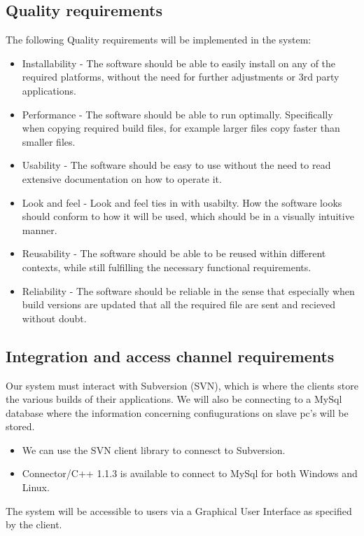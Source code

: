\documentclass[a4paper,12pt,final]{article}
\begin{document}
\subsection{Quality requirements}
The following Quality requirements will be implemented in the system:
\begin{itemize}
\item Installability - The software should be able to easily install on any of the required platforms, without the need for further adjustments or 3rd party applications.
\item Performance - The software should be able to run optimally. Specifically when copying required build files, for example larger files copy faster than smaller files.
\item Usability - The software should be easy to use without the need to read extensive documentation on how to operate it.
\item Look and feel - Look and feel ties in with usabilty.  How the software looks should conform to how it will be used, which should be in a visually intuitive manner.
\item Reusability - The software should be able to be reused within different contexts, while still fulfilling the necessary functional requirements.
\item Reliability - The software should be reliable in the sense that especially when build versions are updated that all the required file are sent and recieved without doubt.
\end{itemize}
\subsection{Integration and access channel requirements}
Our system must interact with Subversion (SVN), which is where the clients store the various builds of their applications. We will also be connecting to a MySql database where the information concerning confiugurations on slave pc's will be stored.
\begin{itemize}
\item We can use the SVN client library to connesct to Subversion.
\item Connector/C++ 1.1.3 is available to connect to MySql for both Windows and Linux.
\end{itemize}
The system will be accessible to users via a Graphical User Interface as specified by the client.
\end{document}

